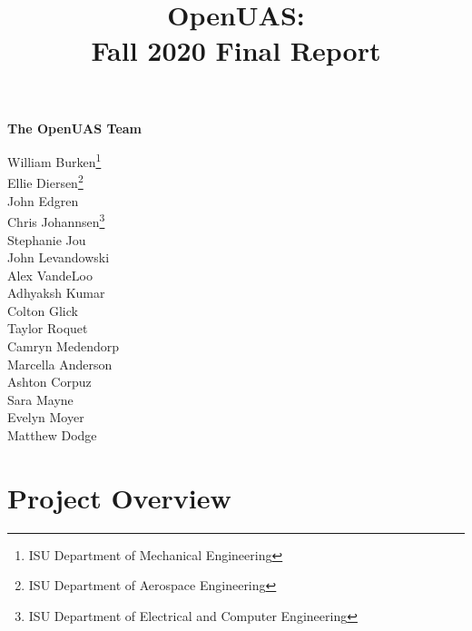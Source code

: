 \documentclass{article}
\title{OpenUAS:\\Fall 2020 Final Report }
\author{ }
\begin{document}
\maketitle

\newpage

\begin{center}
\Large \textbf{The OpenUAS Team}

\vspace{1cm}

\large{
 William Burken\footnote[1]{ISU Department of Mechanical Engineering}\\
 Ellie Diersen\footnote[2]{ISU Department of Aerospace Engineering}\\
 John Edgren\footnotemark[2]\\
 Chris Johannsen\footnote[3]{ISU Department of Electrical and Computer Engineering}\\
 Stephanie Jou\footnotemark[2]\\
 John Levandowski\footnotemark[2]\\
 Alex VandeLoo\footnotemark[2] \footnotemark[3]\\
 Adhyaksh Kumar\footnotemark[2]\\
 Colton Glick\footnotemark[3]\\
 Taylor Roquet\footnotemark[2]\\
 Camryn Medendorp\footnotemark[2]\\
 Marcella Anderson\footnotemark[3]\\
 Ashton Corpuz\footnotemark[1]\\
 Sara Mayne\footnotemark[1]\\
 Evelyn Moyer\footnotemark[2]\\
 Matthew Dodge\footnotemark[1]\\
}\par

\end{center}

\newpage


\tableofcontents

\section{Project Overview}
\end{document}
